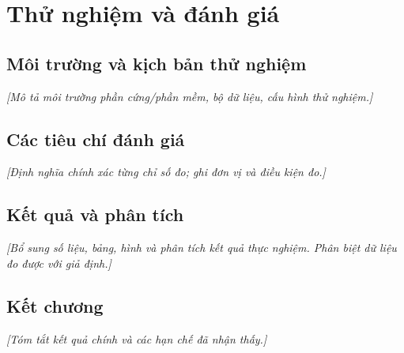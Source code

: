 \chapter{Thử nghiệm và đánh giá}
\label{chap:thu-nghiem}
\section{Môi trường và kịch bản thử nghiệm}
\textit{[Mô tả môi trường phần cứng/phần mềm, bộ dữ liệu, cấu hình thử nghiệm.]}

\section{Các tiêu chí đánh giá}
\textit{[Định nghĩa chính xác từng chỉ số đo; ghi đơn vị và điều kiện đo.]}


\section{Kết quả và phân tích}
\textit{[Bổ sung số liệu, bảng, hình và phân tích kết quả thực nghiệm.
Phân biệt dữ liệu đo được với giả định.]}

\section{Kết chương}
\textit{[Tóm tắt kết quả chính và các hạn chế đã nhận thấy.]}
